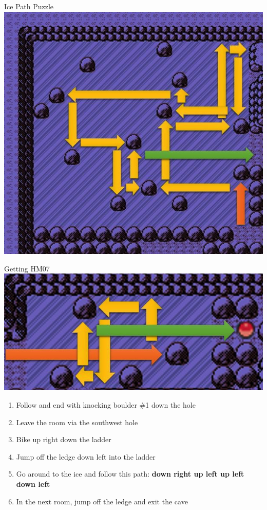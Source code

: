 \begin{paracol}{2}
\switchcolumn
\begin{story}{Ice Path Puzzle}
	\varwb
	\includegraphics[scale=0.4]{../Graphics/12. Ice Path 1.png}
	\varwe
\end{story}

\switchcolumn
\begin{story}{Getting HM07}
	\varwb
	\includegraphics[scale=0.25]{../Graphics/13. Ice Path 2.png}
	\varwe
\end{story}

\begin{enumerate}[resume]
	\item Follow  and end with knocking boulder \#1 down the hole
	\item Leave the room via the southwest hole
	\item Bike up \pointRight{} right \pointRight{} down the ladder
	\item Jump off the ledge  \pointRight{} down \pointRight{} left \pointRight{} into the ladder 
	\item Go around to the ice and follow this path: \textbf{down \pointRight{} right \pointRight{} up \pointRight{} left \pointRight{} up \pointRight{} left \pointRight{} down \pointRight{} left}
	\item In the next room, jump off the ledge and exit the cave 
\end{enumerate}


\end{paracol}
